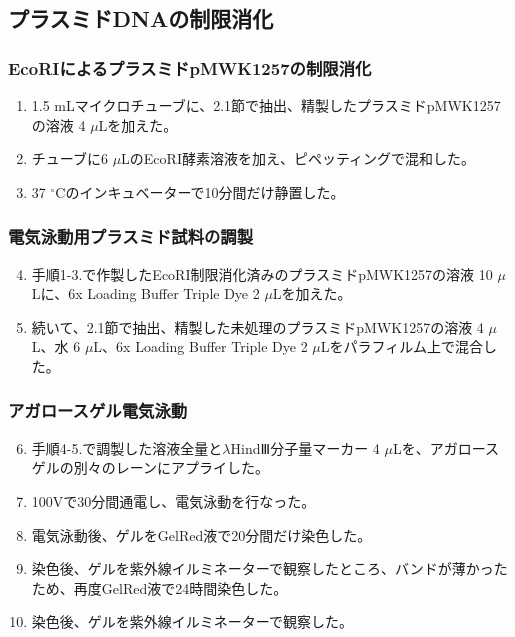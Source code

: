 \documentclass[paper=a4, head_space=20mm, foot_space=25mm]{jlreq}
\begin{document}
        \subsection{プラスミドDNAの制限消化}
            \subsubsection*{EcoRIによるプラスミドpMWK1257の制限消化}
                \begin{enumerate}
                    \item 1.5 mLマイクロチューブに、2.1節で抽出、精製したプラスミドpMWK1257の溶液 4 $\mu$Lを加えた。
                    \item チューブに6 $\mu$LのEcoRI酵素溶液を加え、ピペッティングで混和した。
                    \item 37 $^\circ$Cのインキュベーターで10分間だけ静置した。
                \end{enumerate}

            \subsubsection*{電気泳動用プラスミド試料の調製}
                \begin{enumerate}
                    \setcounter{enumi}{3}
                    \item 手順1-3.で作製したEcoRI制限消化済みのプラスミドpMWK1257の溶液 10 $\mu$Lに、6x Loading Buffer Triple Dye 2 $\mu$Lを加えた。
                    \item 続いて、2.1節で抽出、精製した未処理のプラスミドpMWK1257の溶液 4 $\mu$L、水 6 $\mu$L、6x Loading Buffer Triple Dye 2 $\mu$Lをパラフィルム上で混合した。
                \end{enumerate}
            
            \subsubsection*{アガロースゲル電気泳動}
                \begin{enumerate}
                    \setcounter{enumi}{5}
                    \item 手順4-5.で調製した溶液全量と$\lambda$HindⅢ分子量マーカー 4 $\mu$Lを、アガロースゲルの別々のレーンにアプライした。
                    \item 100Vで30分間通電し、電気泳動を行なった。
                    \item 電気泳動後、ゲルをGelRed液で20分間だけ染色した。
                    \item 染色後、ゲルを紫外線イルミネーターで観察したところ、バンドが薄かったため、再度GelRed液で24時間染色した。
                    \item 染色後、ゲルを紫外線イルミネーターで観察した。
                \end{enumerate}
\end{document}
